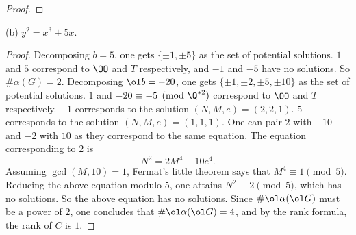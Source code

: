 \documentclass[11pt, oneside]{article}
\begin{document}
\begin{enumerate}
\begin{proof}
\end{proof}
(b) \qquad$y^2 = x^3+5x$.
\begin{proof}
Decomposing $b=5$, one gets $\{ \pm1,\pm 5\}$ as the set of potential solutions. $1$ and $5$ correspond to $\OO$ and $T$ respectively, and $-1$ and $-5$ have no solutions. So $\# \alpha(G) = 2$. Decomposing $\ol b = -20$, one gets $\{\pm 1,\pm2,\pm5,\pm 10\}$ as the set of potential solutions. $1$ and $-20\equiv -5\pmod{\Q^{*2}}$ correspond to $\OO$ and $T$ respectively. $-1$ corresponds to the solution $(N, M, e) = (2,2,1)$. $5$ corresponds to the solution $(N, M, e) = (1,1,1)$. One can pair $2$ with $-10$ and $-2$ with $10$ as they correspond to the same equation. The equation corresponding to $2$ is 
$$
N^2 = 2M^4 -10e^4.
$$
Assuming $\gcd(M,10)=1$, Fermat's little theorem says that $M^4 \equiv 1\pmod 5$. Reducing the above equation modulo $5$, one attains $N^2 \equiv 2\pmod 5$, which has no solutions. So the above equation has no solutions. Since $\#\ol\alpha(\ol G)$ must be a power of $2$, one concludes that $\#\ol\alpha(\ol G) = 4$, and by the rank formula, the rank of $C$ is $1$.
\end{proof}
\end{enumerate}
\medskip



\end{document}
